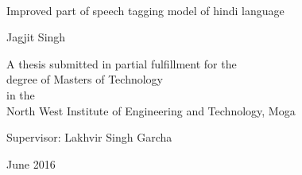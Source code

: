 \documentclass[12pt,a4paper,oneside]{memoir}
\begin{document}
%
%
\thispagestyle{empty}

{%
\sffamily
\centering
\Large

~\vspace{\fill}

{\huge 
Improved part of speech tagging model of hindi language
}

\vspace{2.5cm}

{\LARGE
Jagjit Singh
}

\vspace{3.5cm}

A thesis submitted in partial fulfillment for the\\
degree of Masters of Technology\\[1em]
in the\\[1em]
North West Institute of Engineering and Technology, Moga

\vspace{3.5cm}

Supervisor: Lakhvir Singh Garcha

\vspace{\fill}

June 2016

}%
\end{document}
